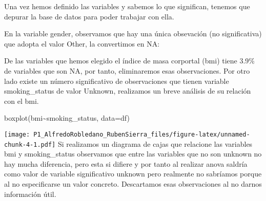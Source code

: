 \documentclass[
]{article}
\newenvironment{Shaded}{\begin{snugshade}}{\end{snugshade}}
\newcommand{\AttributeTok}[1]{\textcolor[rgb]{0.77,0.63,0.00}{#1}}
\newcommand{\ConstantTok}[1]{\textcolor[rgb]{0.00,0.00,0.00}{#1}}
\newcommand{\FunctionTok}[1]{\textcolor[rgb]{0.00,0.00,0.00}{#1}}
\newcommand{\NormalTok}[1]{#1}
\newcommand{\OtherTok}[1]{\textcolor[rgb]{0.56,0.35,0.01}{#1}}
\newcommand{\SpecialCharTok}[1]{\textcolor[rgb]{0.00,0.00,0.00}{#1}}
\newcommand{\StringTok}[1]{\textcolor[rgb]{0.31,0.60,0.02}{#1}}
\begin{document}
Una vez hemos definido las variables y sabemos lo que significan,
tenemos que depurar la base de datos para poder trabajar con ella.

En la variable gender, observamos que hay una única obsevación (no
significativa) que adopta el valor Other, la convertimos en NA:

\begin{Shaded}
\end{Shaded}

De las variables que hemos elegido el índice de masa corportal (bmi)
tiene 3.9\% de variables que son NA, por tanto, eliminaremos esas
observaciones. Por otro lado existe un número significativo de
observaciones que tienen variable smoking\_status de valor Unknown,
realizamos un breve análisis de su relación con el bmi.

\begin{Shaded}
\begin{Highlighting}[]
\FunctionTok{boxplot}\NormalTok{(bmi}\SpecialCharTok{\textasciitilde{}}\NormalTok{smoking\_status, }\AttributeTok{data=}\NormalTok{df)}
\end{Highlighting}
\end{Shaded}

\texttt{[image: P1\_AlfredoRobledano\_RubenSierra\_files/figure-latex/unnamed-chunk-4-1.pdf]}
Si realizamos un diagrama de cajas que relacione las variables bmi y
smoking\_status observamos que entre las variables que no son unknown no
hay mucha diferencia, pero esta si difiere y por tanto al realizar anova
saldría como valor de variable significativo unknown pero realmente no
sabríamos porque al no especificarse un valor concreto. Descartamos esas
observaciones al no darnos información útil.

\begin{Shaded}
\end{Shaded}
\end{document}
